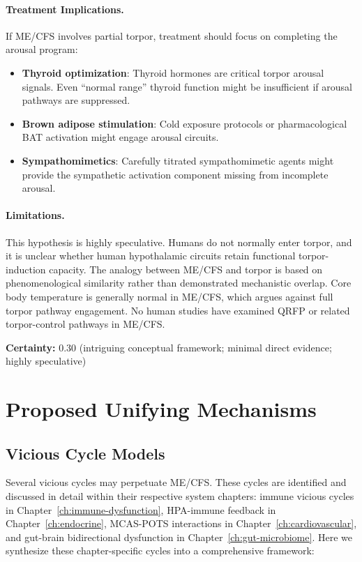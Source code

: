 \begin{speculation}
\paragraph{Treatment Implications.}
If ME/CFS involves partial torpor, treatment should focus on completing the arousal program:
\begin{itemize}
    \item \textbf{Thyroid optimization}: Thyroid hormones are critical torpor arousal signals. Even ``normal range'' thyroid function might be insufficient if arousal pathways are suppressed.
    \item \textbf{Brown adipose stimulation}: Cold exposure protocols or pharmacological BAT activation might engage arousal circuits.
    \item \textbf{Sympathomimetics}: Carefully titrated sympathomimetic agents might provide the sympathetic activation component missing from incomplete arousal.
\end{itemize}

\paragraph{Limitations.}
This hypothesis is highly speculative. Humans do not normally enter torpor, and it is unclear whether human hypothalamic circuits retain functional torpor-induction capacity. The analogy between ME/CFS and torpor is based on phenomenological similarity rather than demonstrated mechanistic overlap. Core body temperature is generally normal in ME/CFS, which argues against full torpor pathway engagement. No human studies have examined QRFP or related torpor-control pathways in ME/CFS.

\textbf{Certainty:} 0.30 (intriguing conceptual framework; minimal direct evidence; highly speculative)
\end{speculation}

\section{Proposed Unifying Mechanisms}
\label{sec:unifying-mechanisms}

\subsection{Vicious Cycle Models}

Several vicious cycles may perpetuate ME/CFS. These cycles are identified and discussed in detail within their respective system chapters: immune vicious cycles in Chapter~\ref{ch:immune-dysfunction}, HPA-immune feedback in Chapter~\ref{ch:endocrine}, MCAS-POTS interactions in Chapter~\ref{ch:cardiovascular}, and gut-brain bidirectional dysfunction in Chapter~\ref{ch:gut-microbiome}. Here we synthesize these chapter-specific cycles into a comprehensive framework:

